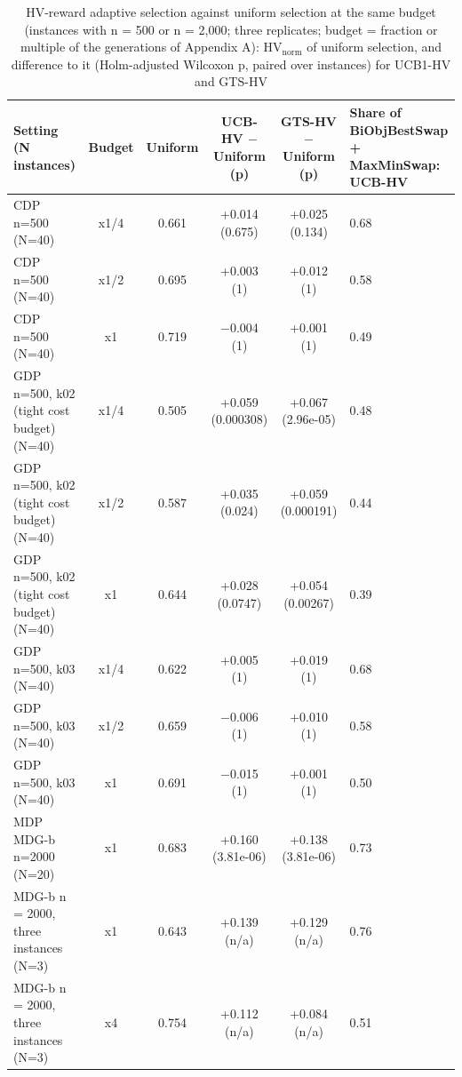 \begin{table}[t]
\centering
\footnotesize
\setlength{\tabcolsep}{4pt}
\caption{HV-reward adaptive selection against uniform selection at the same budget (instances with n = 500 or n = 2,000; three replicates; budget = fraction or multiple of the generations of Appendix A): $\mathrm{HV}_{\mathrm{norm}}$ of uniform selection, and difference to it (Holm-adjusted Wilcoxon p, paired over instances) for UCB1-HV and GTS-HV}\label{tab:13}
\begin{tabularx}{\linewidth}{lccccX}
\toprule
Setting (N instances) & Budget & Uniform & UCB-HV $-$ Uniform (p) & GTS-HV $-$ Uniform (p) & Share of BiObjBestSwap + MaxMinSwap: UCB-HV \\
\midrule
CDP n=500 (N=40) & x1/4 & 0.661 & +0.014 (0.675) & +0.025 (0.134) & 0.68 \\
CDP n=500 (N=40) & x1/2 & 0.695 & +0.003 (1) & +0.012 (1) & 0.58 \\
CDP n=500 (N=40) & x1 & 0.719 & $-$0.004 (1) & +0.001 (1) & 0.49 \\
GDP n=500, k02 (tight cost budget) (N=40) & x1/4 & 0.505 & +0.059 (0.000308) & +0.067 (2.96e-05) & 0.48 \\
GDP n=500, k02 (tight cost budget) (N=40) & x1/2 & 0.587 & +0.035 (0.024) & +0.059 (0.000191) & 0.44 \\
GDP n=500, k02 (tight cost budget) (N=40) & x1 & 0.644 & +0.028 (0.0747) & +0.054 (0.00267) & 0.39 \\
GDP n=500, k03 (N=40) & x1/4 & 0.622 & +0.005 (1) & +0.019 (1) & 0.68 \\
GDP n=500, k03 (N=40) & x1/2 & 0.659 & $-$0.006 (1) & +0.010 (1) & 0.58 \\
GDP n=500, k03 (N=40) & x1 & 0.691 & $-$0.015 (1) & +0.001 (1) & 0.50 \\
MDP MDG-b n=2000 (N=20) & x1 & 0.683 & +0.160 (3.81e-06) & +0.138 (3.81e-06) & 0.73 \\
MDG-b n = 2000, three instances (N=3) & x1 & 0.643 & +0.139 (n/a) & +0.129 (n/a) & 0.76 \\
MDG-b n = 2000, three instances (N=3) & x4 & 0.754 & +0.112 (n/a) & +0.084 (n/a) & 0.51 \\
\bottomrule
\end{tabularx}
\end{table}

